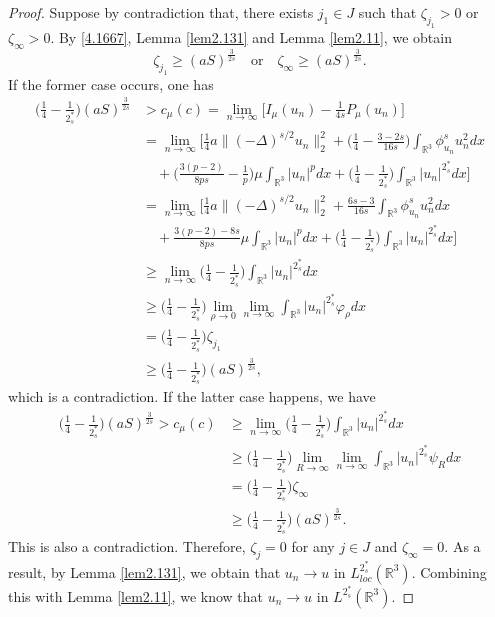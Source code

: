 \documentclass[reqno]{amsart}
\begin{document}
\begin{proof}
 Suppose by contradiction that, there exists $j_1\in J$ such that $\zeta_{j_1}>0$ 
or $\zeta_\infty>0$.  By  \eqref{4.1667}, Lemma {\ref{lem2.131}} and  
Lemma  \ref{lem2.11}, we obtain
$$
\zeta_{j_1}\geq (aS)^{\frac{3}{2s}} \quad\text{or}\quad
\zeta_{\infty}\geq (aS)^{\frac{3}{2s}}.
$$
If the former case occurs, one has
\begin{align*}
\Big(\frac{1}{4}-\frac{1}{2^*_s}\Big)(aS)^{\frac{3}{2s}}
&>c_\mu(c)
=\lim_{n\to \infty}\Big[I_\mu(u_n)-\frac{1}{4s}P_\mu(u_n)\Big]\\
&=  \lim_{n\to \infty}\big[\frac{1}{4}a\|(-\Delta)^{s/2}u_n\|^2_2
 +\Big(\frac{1}{4}-\frac{3-2s}{16s}\Big)\int_{\mathbb{R}^3}\phi^s_{u_n}u^2_ndx\\
&\quad +\Big(\frac{3(p-2)}{8ps}-\frac{1}{p}\Big)
 \mu \int_{\mathbb{R}^3}|u_n|^pdx
 +\Big(\frac{1}{4}-\frac{1}{2^*_s}\Big)\int_{\mathbb{R}^3}|u_n|^{2^*_s}dx\Big]\\
&=  \lim_{n\to \infty}\Big[\frac{1}{4}a\|(-\Delta)^{s/2}u_n\|^2_2
 +\frac{6s-3}{16s}\int_{\mathbb{R}^3}\phi^s_{u_n}u^2_ndx\\
&\quad +\frac{3(p-2)-8s}{8ps}\mu \int_{\mathbb{R}^3}|u_n|^pdx+\Big(\frac{1}{4}
 -\frac{1}{2^*_s}\Big)\int_{\mathbb{R}^3}|u_n|^{2^*_s}dx\Big]\\
&\geq \lim_{n\to \infty}\Big(\frac{1}{4}-\frac{1}{2^*_s}\Big)
 \int_{\mathbb{R}^3}|u_n|^{2^*_s}dx\\
&\geq \Big(\frac{1}{4}-\frac{1}{2^*_s}\Big)\lim_{\rho\to 0}
 \lim_{n\to \infty}\int_{\mathbb{R}^3}|u_n|^{2^*_s}\varphi_\rho dx\\
&=  \Big(\frac{1}{4}-\frac{1}{2^*_s}\Big)\zeta_{j_1}\\
&\geq\Big(\frac{1}{4}-\frac{1}{2^*_s}\Big) (aS)^{\frac{3}{2s}},
\end{align*}
which is a contradiction. If the latter case happens, we have
\begin{align*}
\Big(\frac{1}{4}-\frac{1}{2^*_s}\Big)(aS)^{\frac{3}{2s}}>c_\mu(c)
&\geq \lim_{n\to \infty}\Big(\frac{1}{4}-\frac{1}{2^*_s}\Big)
 \int_{\mathbb{R}^3}|u_n|^{2^*_s}dx\\
&\geq \Big(\frac{1}{4}-\frac{1}{2^*_s}\Big)\lim_{R\to \infty}
 \lim_{n\to \infty}\int_{\mathbb{R}^3}|u_n|^{2^*_s}\psi_R dx\\
&= \Big(\frac{1}{4}-\frac{1}{2^*_s}\Big)\zeta_\infty \\
&\geq\Big(\frac{1}{4}-\frac{1}{2^*_s}\Big) (aS)^{\frac{3}{2s}}.
\end{align*}
This is also a contradiction. Therefore, $\zeta_j=0$ for any 
$j\in J$ and $\zeta_\infty=0$. As a result, by Lemma \ref{lem2.131}, 
we obtain that $u_n\to u$ in $L^{2^*_s}_{loc}(\mathbb{R}^3)$.
Combining this with   Lemma \ref{lem2.11}, we know that $u_n\to u$ in 
$L^{2^*_s}(\mathbb{R}^3)$.
\smallskip


\end{proof}
\end{document}
